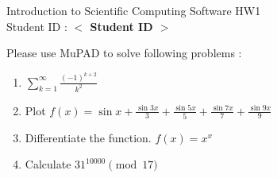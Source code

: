 \documentclass[12pt,a4paper]{article}
\newcommand{\placeholder}[1]{\textbf{$<$ #1 $>$}}
\newcommand{\idnumber}{\placeholder{Student ID}}
\begin{document}
\begin{flushleft}Introduction to Scientific Computing Software HW1
\\Student ID : \idnumber{}\end{flushleft}

Please use MuPAD to solve following problems : 
\begin{enumerate}
\item 
$\displaystyle{\sum^\infty_{k=1}\frac{(-1)^{k+2}}{k^2}}$

\item Plot
$\displaystyle{f(x)=\sin x+\frac{\sin 3x}{3}+\frac{\sin5x}{5}+\frac{\sin7x}{7}+\frac{\sin9x}{9}}$

\item Differentiate the function. $f(x)=x^x$

\item Calculate $31^{10000}\pmod{17}$

\end{enumerate}
\end{document}
